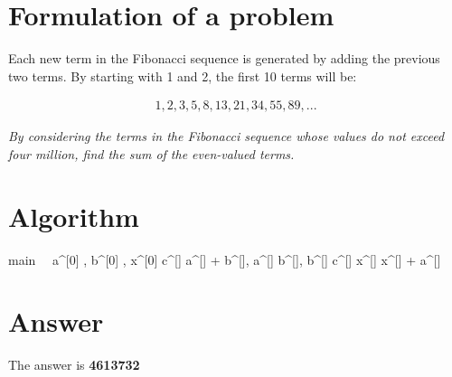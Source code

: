 \documentclass[12pt]{article}
\begin{document}
\maketitle

\section{Formulation of a problem}
Each new term in the Fibonacci sequence is generated by adding the previous two terms. By starting with 1 and 2, the first 10 terms will be:

\begin{align*}
1, 2, 3, 5, 8, 13, 21, 34, 55, 89, ...
\end{align*}

\emph{By considering the terms in the Fibonacci sequence whose values do not
exceed four million, find the sum of the even-valued terms.}

\section{Algorithm}
\begin{eqcode}{main}{\ }{\ }{}
  a^{[0]} ,
  b^{[0]} ,
  x^{[0]}  \lend
  c^{[\iter]} \gets a^{[]} + b^{[]},
  a^{[\iter]} \gets b^{[]},
  b^{[\iter]} \gets c^{[]} \lend
    x^{[\iter]} \gets x^{[]} + a^{[\iter]} \lend
  \qendif
   \lend

\end{eqcode}

\section{Answer}
  The answer is \bf{4613732}
\end{document}

